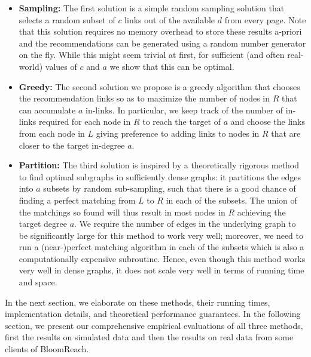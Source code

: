 \begin{itemize}
\item {\bf Sampling:} The first solution is a simple random sampling solution that selects a random subset of $c$ links out of the available $d$ from every page. Note that this solution requires no memory overhead to store these results a-priori and the recommendations can be generated using a random number generator on the fly. While this might seem trivial at first, for sufficient (and often real-world) values of $c$ and $a$ we show that this can be optimal.
\item {\bf Greedy:} The second solution we propose is a greedy algorithm that chooses the recommendation links so as to maximize the number of nodes in $R$ that can accumulate $a$ in-links. In particular, we keep track of the number of in-links required for each node in $R$ to reach the target of $a$ and choose the links from each node in $L$ giving preference to adding links to nodes in $R$ that are closer to the target in-degree $a$.
\item {\bf Partition:} The third solution is inspired by a theoretically rigorous method to find optimal subgraphs in sufficiently dense graphs: it partitions the edges into $a$ subsets by random sub-sampling, such that there is a good chance of finding a perfect matching from $L$ to $R$ in each of the subsets. The union of the matchings so found will thus result in most nodes in $R$ achieving the target degree $a$. We require the number of edges in the underlying graph to be significantly large for this method to work very well; moreover, we need to run a (near-)perfect matching algorithm in each of the subsets which is also a computationally expensive subroutine. Hence, even though this method works very well in dense graphs, it does not scale very well in terms of running time and space.
\end{itemize}

In the next section, we elaborate on these methods, their running times, implementation details, and theoretical performance guarantees. In the following section, we present our comprehensive empirical evaluations of all three methods, first the results on simulated data and then the results on real data from some clients of BloomReach.
